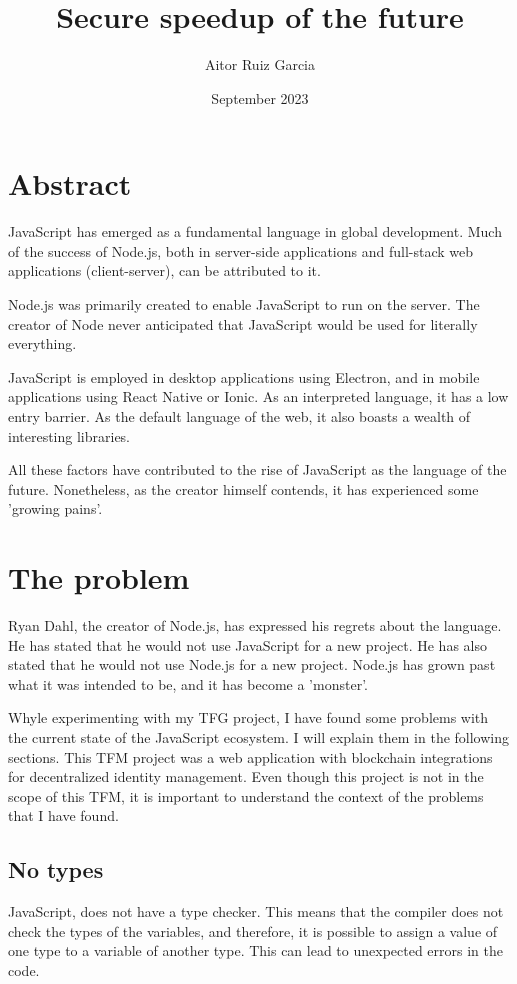\documentclass[12pt, letterpaper]{article}
\title{Secure speedup of the future}
\author{Aitor Ruiz Garcia}
\date{September 2023}
\begin{document}
\maketitle
\begin{multicols}{2}
    \section{Abstract}
    JavaScript has emerged as a fundamental language in global development. Much of the success of Node.js, both in server-side applications and full-stack web applications (client-server), can be attributed to it.

    Node.js was primarily created to enable JavaScript to run on the server. The creator of Node never anticipated that JavaScript would be used for literally everything.

    JavaScript is employed in desktop applications using Electron, and in mobile applications using React Native or Ionic. As an interpreted language, it has a low entry barrier. As the default language of the web, it also boasts a wealth of interesting libraries.

    All these factors have contributed to the rise of JavaScript as the language of the future. Nonetheless, as the creator himself contends, it has experienced some 'growing pains'.
    \section{The problem}

    Ryan Dahl, the creator of Node.js, has expressed his regrets about the language. He has stated that he would not use JavaScript for a new project. He has also stated that he would not use Node.js for a new project. Node.js has grown past what it was intended to be, and it has become a 'monster'.

    Whyle experimenting with my TFG project, I have found some problems with the current state of the JavaScript ecosystem. I will explain them in the following sections. This TFM project was a web application with blockchain integrations for decentralized identity management. Even though this project is not in the scope of this TFM, it is important to understand the context of the problems that I have found.

    \subsection{No types}
    JavaScript, does not have a type checker. This means that the compiler does not check the types of the variables, and therefore, it is possible to assign a value of one type to a variable of another type. This can lead to unexpected errors in the code.


\end{multicols}
\end{document}
